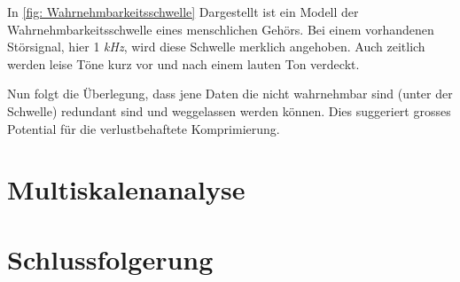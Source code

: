 \begin{refsection}
In \autoref{fig: Wahrnehmbarkeitsschwelle} Dargestellt ist ein Modell der Wahrnehmbarkeitsschwelle eines menschlichen Gehörs.
Bei einem vorhandenen Störsignal, hier 1 \textit{kHz}, wird diese Schwelle merklich angehoben.
Auch zeitlich werden leise Töne kurz vor und nach einem lauten Ton verdeckt.

Nun folgt die Überlegung, dass jene Daten die nicht wahrnehmbar sind (unter der Schwelle) redundant sind und weggelassen werden können.
Dies suggeriert grosses Potential für die verlustbehaftete Komprimierung.

\section{Multiskalenanalyse}

\rhead{}
\section{Schlussfolgerung}

\printbibliography[heading=subbibliography]
\end{refsection}
